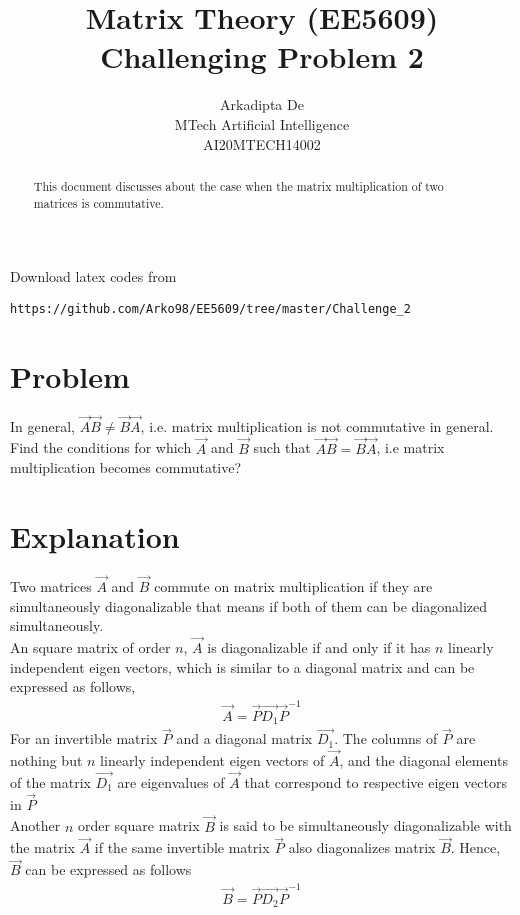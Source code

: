 \documentclass[journal,12pt,twocolumn]{IEEEtran}
\begin{document}
     \def\rightbox#1{\makebox[0in][r]{#1}}
     \def\centbox#1{\makebox[0in]{#1}}
     \def\topbox#1{\raisebox{-\baselineskip}[0in][0in]{#1}}
     \def\midbox#1{\raisebox{-0.5\baselineskip}[0in][0in]{#1}}
\vspace{3cm}
\title{Matrix Theory (EE5609) Challenging Problem 2}
\author{Arkadipta De\\MTech Artificial Intelligence\\AI20MTECH14002}
\maketitle
\newpage
\bigskip
\renewcommand{\thefigure}{\theenumi}
\renewcommand{\thetable}{\theenumi}
\begin{abstract}
This document discusses about the case when the matrix multiplication of two matrices is commutative.
\end{abstract}
Download latex codes from 
%
\begin{lstlisting}
https://github.com/Arko98/EE5609/tree/master/Challenge_2
\end{lstlisting}
%
\section{Problem}
In general, $\vec{A}\vec{B} \not= \vec{B}\vec{A}$, i.e. matrix multiplication is not commutative in general. Find the conditions for which $\vec{A}$ and $\vec{B}$ such that $\vec{A}\vec{B} = \vec{B}\vec{A}$, i.e matrix multiplication becomes commutative?
\section{Explanation}
Two matrices $\vec{A}$ and $\vec{B}$ commute on matrix multiplication if they are simultaneously diagonalizable that means if both of them can be diagonalized simultaneously.\\
An square matrix of order $n$, $\vec{A}$ is diagonalizable if and only if it has $n$ linearly independent eigen vectors, which is similar to a diagonal matrix and can be expressed as follows,
\begin{align}\label{eq1}
    \vec{A} = \vec{P}\vec{D_1}\vec{P}^{-1}
\end{align}
For an invertible matrix $\vec{P}$ and a diagonal matrix $\vec{D_1}$. The columns of $\vec{P}$ are nothing but $n$ linearly independent eigen vectors of $\vec{A}$, and the diagonal elements of the matrix $\vec{D_1}$ are eigenvalues of $\vec{A}$ that correspond to respective eigen vectors in $\vec{P}$\\
Another $n$ order square matrix $\vec{B}$ is said to be simultaneously diagonalizable with the matrix $\vec{A}$ if the same invertible matrix $\vec{P}$ also diagonalizes matrix $\vec{B}$. Hence, $\vec{B}$ can be expressed as follows
\begin{align}\label{eq2}
    \vec{B} = \vec{P}\vec{D_2}\vec{P}^{-1}
\end{align}
\end{document}
